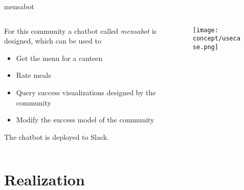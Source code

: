 \begin{frame}{mensabot}
  \begin{columns}
    \begin{column}[]{0.3\textwidth}
      For this community a chatbot called \emph{mensabot} is designed, which can be used to
  \begin{itemize}
    \item Get the menu for a canteen
    \item Rate meals
    \item Query success visualizations designed by the community
    \item Modify the success model of the community
  \end{itemize}
  The chatbot is deployed to Slack.
    \end{column}
    \begin{column}[]{0.7\textwidth}
      \begin{figure}
            \centering
            \texttt{[image: concept/usecase.png]}
          \end{figure}
      \end{column}     
  \end{columns}
\end{frame}





\section{Realization}

